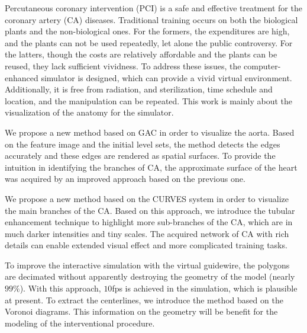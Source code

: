
\begin{englishabstract}

Percutaneous coronary intervention (PCI) is a safe and effective treatment for the coronary artery (CA) diseases.
Traditional training occurs on both the biological plants and the non-biological ones. 
For the formers, the expenditures are high, and the plants can not be used repeatedly, let alone the public controversy. 
For the latters, though the costs are relatively affordable and the plants can be reused, they lack sufficient vividness. 
To address these issues, the computer-enhanced simulator is designed, which can provide a vivid virtual environment.
Additionally, it is free from radiation, and sterilization, time schedule and location, and the manipulation can be repeated. 
This work is mainly about the visualization of the anatomy for the simulator.

We propose a new method based on GAC in order to visualize the aorta.
Based on the feature image and the initial level sets, the method detects the edges accurately and these edges are rendered as spatial surfaces. 
To provide the intuition in identifying the branches of CA, the approximate surface of the heart was acquired by an improved approach based on the previous one. 

We propose a new method based on the CURVES system in order to visualize the main branches of the CA. 
Based on this approach, we introduce the tubular enhancement technique to highlight more sub-branches of the CA, which are in much darker intensities and tiny scales.
The acquired network of CA with rich details can enable extended visual effect and more complicated training tasks.

To improve the interactive simulation with the virtual guidewire, the polygons are decimated without apparently destroying the geometry of the model (nearly $99 \%$).
With this approach, $10$fps is achieved in the simulation, which is plausible at present.
To extract the centerlines, we introduce the method based on the Voronoi diagrams. 
This information on the geometry will be benefit for the modeling of the interventional procedure.

%
\end{englishabstract}
